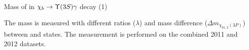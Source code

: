 \begin{frame}{Mass of \chiboneThreeP in $\chib \to \Y3S \gamma$ decay (1)}
\setlength{\unitlength}{1mm}
\centering
{}
\begin{block}{}
\scriptsize
The mass is measured with different ratios ($\lambda$) and mass difference 
($\Delta{m_{\chi_{b1,2}(3P)}}$) between \chiboneThreeP and \chibtwoThreeP states.
The measurement is performed on the combined 2011 and 2012 datasets.
\end{block}



\end{frame}